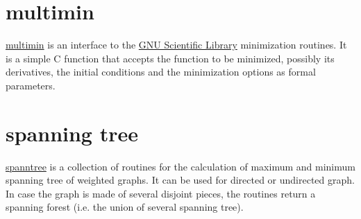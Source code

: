 \documentclass[11pt]{article}
\begin{document}
\section{multimin}
\label{sec-8}


  \href{file://.software/multimin/miltimin.html}{multimin} is an interface to the \href{http://www.gnu.org/software/gsl/}{GNU Scientific Library} minimization
  routines. It is a simple C function that accepts the function to be
  minimized, possibly its derivatives, the initial conditions and the
  minimization options as formal parameters.
\section{spanning tree}
\label{sec-9}


  \href{file://.software/spanntree/spanntree.tar.gx}{spanntree} is a collection of routines for the calculation of maximum
  and minimum spanning tree of weighted graphs. It can be used for
  directed or undirected graph. In case the graph is made of several
  disjoint pieces, the routines return a spanning forest (i.e. the
  union of several spanning tree).
\end{document}
